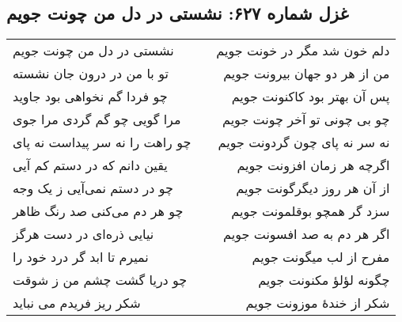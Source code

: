 \begin{center}
\section*{غزل شماره ۶۲۷: نشستی در دل من چونت جویم}
\label{sec:627}
\begin{longtable}{l p{0.5cm} r}
نشستی در دل من چونت جویم
&&
دلم خون شد مگر در خونت جویم
\\
تو با من در درون جان نشسته
&&
من از هر دو جهان بیرونت جویم
\\
چو فردا گم نخواهی بود جاوید
&&
پس آن بهتر بود کاکنونت جویم
\\
مرا گویی چو گم گردی مرا جوی
&&
چو بی چونی تو آخر چونت جویم
\\
چو راهت را نه سر پیداست نه پای
&&
نه سر نه پای چون گردونت جویم
\\
یقین دانم که در دستم کم آیی
&&
اگرچه هر زمان افزونت جویم
\\
چو در دستم نمی‌آیی ز یک وجه
&&
از آن هر روز دیگرگونت جویم
\\
چو هر دم می‌کنی صد رنگ ظاهر
&&
سزد گر همچو بوقلمونت جویم
\\
نیایی ذره‌ای در دست هرگز
&&
اگر هر دم به صد افسونت جویم
\\
نمیرم تا ابد گر درد خود را
&&
مفرح از لب میگونت جویم
\\
چو دریا گشت چشم من ز شوقت
&&
چگونه لؤلؤ مکنونت جویم
\\
شکر ریز فریدم می نباید
&&
شکر از خندهٔ موزونت جویم
\\
\end{longtable}
\end{center}

